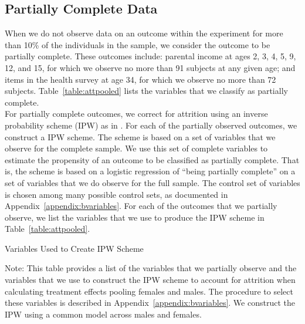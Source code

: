 \subsection{Partially Complete Data}
\label{app:method_partialobs}

When we do not observe data on an outcome within the experiment for more than 10\% of the individuals in the sample, we consider the outcome to be partially complete. These outcomes include: parental income at ages 2, 3, 4, 5, 9, 12, and 15, for which we observe no more than 91 subjects at any given age; and items in the health survey at age 34, for which we observe no more than 72 subjects. Table~\ref{table:attpooled} lists the variables that we classify as partially complete.\\

\noindent For partially complete outcomes, we correct for attrition using an inverse probability scheme (IPW) as in  \citet{Horvitz_Thompson_1952_JASA}. For each of the partially observed outcomes, we construct a IPW scheme. The scheme is based on a set of variables that we observe for the complete sample. We use this set of complete variables to estimate the propensity of an outcome to be classified as partially complete. That is, the scheme is based on a logistic regression of ``being partially complete'' on a set of variables that we do observe for the full sample. The control set of variables is chosen among many possible control sets,  as documented in Appendix~\ref{appendix:bvariables}. For each of the outcomes that we partially observe, we list the variables that we use to produce the IPW scheme in Table~\ref{table:attpooled}.

\begin{table}
\begin{threeparttable}
\caption{Variables Used to Create IPW Scheme}
\label{table:attpooled}
\centering

\begin{tablenotes}
\footnotesize
\item Note: This table provides a list of the variables that we partially observe and the variables that we use to construct the IPW scheme to account for attrition when calculating treatment effects pooling females and males. The procedure to select these variables is described in Appendix~\ref{appendix:bvariables}. We construct the IPW using a common model across males and females.
\end{tablenotes}
\end{threeparttable}
\end{table}
\restoregeometry
\doublespacing


